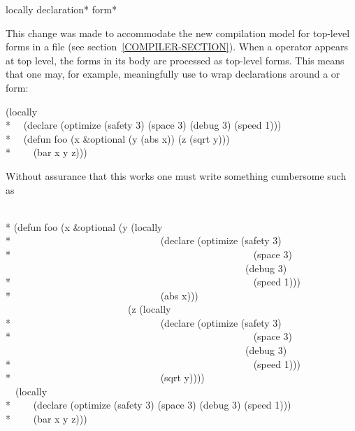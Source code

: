 \begin{defspec}
locally {declaration}* {form}*

This change was made to accommodate the new compilation model for top-level forms
in a file (see section~\ref{COMPILER-SECTION}).
When a  operator appears at top level, the forms in its body are
processed as top-level forms.  This means that one may, for example, meaningfully use
 to wrap declarations around a  or  form:
\begin{lisp}
(locally \\*
~~(declare (optimize (safety 3) (space 3) (debug 3) (speed 1))) \\*
~~(defun foo (x \&optional (y (abs x)) (z (sqrt y))) \\*
~~~~(bar x y z)))
\end{lisp}
Without assurance that this works
one must write something cumbersome such as
\begin{lisp}
 \\*
(defun foo (x \&optional (y (locally \\*
~~~~~~~~~~~~~~~~~~~~~~~~~~~~~~(declare (optimize (safety 3) \\*
~~~~~~~~~~~~~~~~~~~~~~~~~~~~~~~~~~~~~~~~~~~~~~~~~(space 3) \\
~~~~~~~~~~~~~~~~~~~~~~~~~~~~~~~~~~~~~~~~~~~~~~~~~(debug 3) \\*
~~~~~~~~~~~~~~~~~~~~~~~~~~~~~~~~~~~~~~~~~~~~~~~~~(speed 1))) \\*
~~~~~~~~~~~~~~~~~~~~~~~~~~~~~~(abs x))) \\
~~~~~~~~~~~~~~~~~~~~~~~~~(z (locally \\*
~~~~~~~~~~~~~~~~~~~~~~~~~~~~~~(declare (optimize (safety 3) \\*
~~~~~~~~~~~~~~~~~~~~~~~~~~~~~~~~~~~~~~~~~~~~~~~~~(space 3) \\
~~~~~~~~~~~~~~~~~~~~~~~~~~~~~~~~~~~~~~~~~~~~~~~~~(debug 3) \\*
~~~~~~~~~~~~~~~~~~~~~~~~~~~~~~~~~~~~~~~~~~~~~~~~~(speed 1))) \\*
~~~~~~~~~~~~~~~~~~~~~~~~~~~~~~(sqrt y)))) \\
~~(locally \\*
~~~~(declare (optimize (safety 3) (space 3) (debug 3) (speed 1))) \\*
~~~~(bar x y z)))
\end{lisp}
\end{defspec}

